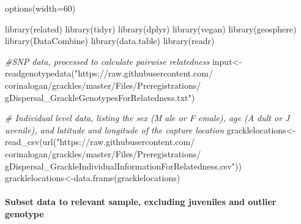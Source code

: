 \documentclass[
]{article}
\newenvironment{Shaded}{\begin{snugshade}}{\end{snugshade}}
\newcommand{\AttributeTok}[1]{\textcolor[rgb]{0.77,0.63,0.00}{#1}}
\newcommand{\CommentTok}[1]{\textcolor[rgb]{0.56,0.35,0.01}{\textit{#1}}}
\newcommand{\DecValTok}[1]{\textcolor[rgb]{0.00,0.00,0.81}{#1}}
\newcommand{\FunctionTok}[1]{\textcolor[rgb]{0.00,0.00,0.00}{#1}}
\newcommand{\NormalTok}[1]{#1}
\newcommand{\OtherTok}[1]{\textcolor[rgb]{0.56,0.35,0.01}{#1}}
\newcommand{\SpecialCharTok}[1]{\textcolor[rgb]{0.00,0.00,0.00}{#1}}
\newcommand{\StringTok}[1]{\textcolor[rgb]{0.31,0.60,0.02}{#1}}
\begin{document}
\begin{Shaded}
\begin{Highlighting}[]
\FunctionTok{options}\NormalTok{(}\AttributeTok{width=}\DecValTok{60}\NormalTok{)}

\FunctionTok{library}\NormalTok{(related)}
\FunctionTok{library}\NormalTok{(tidyr)}
\FunctionTok{library}\NormalTok{(dplyr)}
\FunctionTok{library}\NormalTok{(vegan)}
\FunctionTok{library}\NormalTok{(geosphere)}
\FunctionTok{library}\NormalTok{(DataCombine)}
\FunctionTok{library}\NormalTok{(data.table)}
\FunctionTok{library}\NormalTok{(readr) }

\CommentTok{\#SNP data, processed to calculate pairwise relatedness}
\NormalTok{input}\OtherTok{\textless{}{-}}\FunctionTok{readgenotypedata}\NormalTok{(}\StringTok{"https://raw.githubusercontent.com/}
\StringTok{                        corinalogan/grackles/master/Files/Preregistrations/}
\StringTok{                        gDispersal\_GrackleGenotypesForRelatedness.txt"}\NormalTok{)}

\CommentTok{\# Individual level data, listing the sex (M ale or F emale), age (A dult or J uvenile), and latitude and longitude of the capture location}
\NormalTok{gracklelocations}\OtherTok{\textless{}{-}}\FunctionTok{read\_csv}\NormalTok{(}\FunctionTok{url}\NormalTok{(}\StringTok{"https://raw.githubusercontent.com/}
\StringTok{                              corinalogan/grackles/master/Files/Preregistrations/}
\StringTok{                              gDispersal\_GrackleIndividualInformationForRelatedness.csv"}\NormalTok{))}
\NormalTok{gracklelocations}\OtherTok{\textless{}{-}}\FunctionTok{data.frame}\NormalTok{(gracklelocations)}
\end{Highlighting}
\end{Shaded}

\hypertarget{subset-data-to-relevant-sample-excluding-juveniles-and-outlier-genotype}{%
\paragraph{Subset data to relevant sample, excluding juveniles and
outlier
genotype}\label{subset-data-to-relevant-sample-excluding-juveniles-and-outlier-genotype}}

\begin{Shaded}
\end{Shaded}
\end{document}
